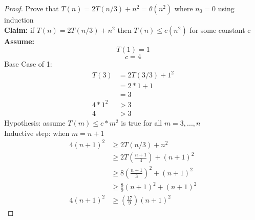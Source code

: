 \documentclass[11pt]{article}
\begin{document}
	\renewcommand{\headrulewidth}{0.4pt}
	\setlength{\headheight}{38.0pt}


	\begin{proof} Prove that $T(n) = 2T(n/3) +n^2 = \theta(n^2)$ where $n_0 = 0$ using induction\\
	 	{\bf Claim:} if $T(n) = 2T(n/3) +n^2$ then $T(n) \leq c(n^2)$ for some constant c\\
	 	{\bf Assume:}	
	 	$$T(1) = 1$$
	 	$$c = 4$$
		Base Case of 1:	
		 	\begin{align*}
		 		T(3) &= 2T(3/3) + 1^2\\
		 		&=2 * 1 + 1\\
		 		&= 3\\
		 		4*1^2&> 3\\
		 		4 &> 3
		 	\end{align*}
		Hypothesis: assume $T(m) \leq c*m^2$ is true for all $m = 3,...,n$\\
		Inductive step: when $m = n + 1$
		\begin{align*}
		  4(n+1)^2 &\geq 2T(n/3) + n^2\\
			&\geq 2T(\frac{n+1}{3}) + (n+1)^2\\
			&\geq 8 (\frac{n+1}{3})^2 + (n+1)^2\\
			&\geq \frac{8}{9}(n+1)^2 + (n+1)^2\\
			4(n+1)^2 &\geq (\frac{17}{9})(n+1)^2
		\end{align*}
	\end{proof}
	\newpage
\end{document}
